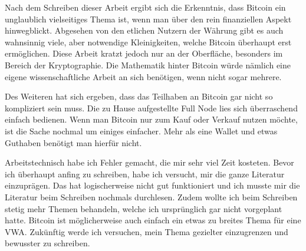 Nach dem Schreiben dieser Arbeit ergibt sich die Erkenntnis, dass Bitcoin ein unglaublich vielseitiges
Thema ist, wenn man über den rein finanziellen Aspekt hinwegblickt. Abgesehen von den etlichen Nutzern
der Währung gibt es auch wahnsinnig viele, aber notwendige Kleinigkeiten, welche Bitcoin überhaupt erst
ermöglichen. Diese Arbeit kratzt jedoch nur an der Oberfläche, besonders im Bereich der Kryptographie.
Die Mathematik hinter Bitcoin würde nämlich eine eigene wissenschaftliche Arbeit an sich benötigen, wenn
nicht sogar mehrere. 

Des Weiteren hat sich ergeben, dass das Teilhaben an Bitcoin gar nicht so kompliziert sein muss. Die zu Hause
aufgestellte Full Node lies sich überraschend einfach bedienen. Wenn man Bitcoin nur zum Kauf oder Verkauf
nutzen möchte, ist die Sache nochmal um einiges einfacher. Mehr als eine Wallet und etwas Guthaben benötigt
man hierfür nicht.

Arbeitstechnisch habe ich Fehler gemacht, die mir sehr viel Zeit kosteten. Bevor ich überhaupt anfing zu
schreiben, habe ich versucht, mir die ganze Literatur einzuprägen. Das hat logischerweise nicht gut
funktioniert und ich musste mir die Literatur beim Schreiben nochmals durchlesen. Zudem wollte ich beim
Schreiben stetig mehr Themen behandeln, welche ich ursprünglich gar nicht vorgeplant hatte. Bitcoin ist
möglicherweise auch einfach ein etwas zu breites Thema für eine VWA. Zukünftig werde ich versuchen, mein 
Thema gezielter einzugrenzen und bewusster zu schreiben.